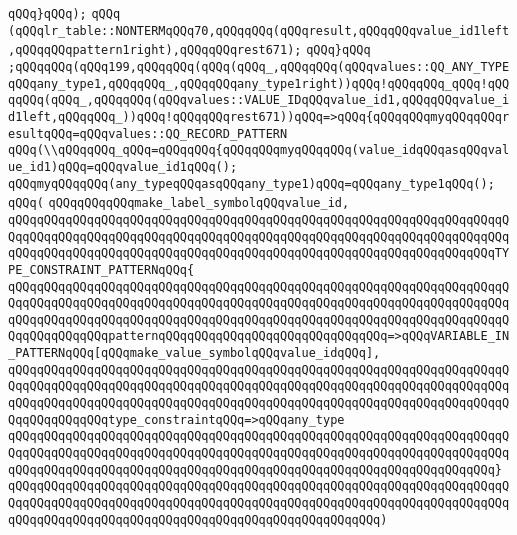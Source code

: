 \verb|qQQq}qQQq);|\newline
\verb|qQQq|\newline
\verb|(qQQqlr_table::NONTERMqQQq70,qQQqqQQq(qQQqresult,qQQqqQQqvalue_id1left,qQQqqQQqpattern1right),qQQqqQQqrest671);|\newline
\verb|qQQq}qQQq|\newline
\verb|;qQQqqQQq(qQQq199,qQQqqQQq(qQQq(qQQq_,qQQqqQQq(qQQqvalues::QQ_ANY_TYPEqQQqany_type1,qQQqqQQq_,qQQqqQQqany_type1right))qQQq!qQQqqQQq_qQQq!qQQqqQQq(qQQq_,qQQqqQQq(qQQqvalues::VALUE_IDqQQqvalue_id1,qQQqqQQqvalue_id1left,qQQqqQQq_))qQQq!qQQqqQQqrest671))qQQq=>qQQq{qQQqqQQqmyqQQqqQQqresultqQQq=qQQqvalues::QQ_RECORD_PATTERN|\newline
\verb|qQQq(\\qQQqqQQq_qQQq=qQQqqQQq{qQQqqQQqmyqQQqqQQq(value_idqQQqasqQQqvalue_id1)qQQq=qQQqvalue_id1qQQq();|\newline
\verb|qQQqmyqQQqqQQq(any_typeqQQqasqQQqany_type1)qQQq=qQQqany_type1qQQq();|\newline
\verb|qQQq(|\newline
\verb|qQQqqQQqqQQqmake_label_symbolqQQqvalue_id,|\newline
\verb|qQQqqQQqqQQqqQQqqQQqqQQqqQQqqQQqqQQqqQQqqQQqqQQqqQQqqQQqqQQqqQQqqQQqqQQqqQQqqQQqqQQqqQQqqQQqqQQqqQQqqQQqqQQqqQQqqQQqqQQqqQQqqQQqqQQqqQQqqQQqqQQqqQQqqQQqqQQqqQQqqQQqqQQqqQQqqQQqqQQqqQQqqQQqqQQqqQQqqQQqqQQqqQQqTYPE_CONSTRAINT_PATTERNqQQq{|\newline
\verb|qQQqqQQqqQQqqQQqqQQqqQQqqQQqqQQqqQQqqQQqqQQqqQQqqQQqqQQqqQQqqQQqqQQqqQQqqQQqqQQqqQQqqQQqqQQqqQQqqQQqqQQqqQQqqQQqqQQqqQQqqQQqqQQqqQQqqQQqqQQqqQQqqQQqqQQqqQQqqQQqqQQqqQQqqQQqqQQqqQQqqQQqqQQqqQQqqQQqqQQqqQQqqQQqqQQqqQQqqQQqqQQqpatternqQQqqQQqqQQqqQQqqQQqqQQqqQQqqQQq=>qQQqVARIABLE_IN_PATTERNqQQq[qQQqmake_value_symbolqQQqvalue_idqQQq],|\newline
\verb|qQQqqQQqqQQqqQQqqQQqqQQqqQQqqQQqqQQqqQQqqQQqqQQqqQQqqQQqqQQqqQQqqQQqqQQqqQQqqQQqqQQqqQQqqQQqqQQqqQQqqQQqqQQqqQQqqQQqqQQqqQQqqQQqqQQqqQQqqQQqqQQqqQQqqQQqqQQqqQQqqQQqqQQqqQQqqQQqqQQqqQQqqQQqqQQqqQQqqQQqqQQqqQQqqQQqqQQqqQQqqQQqtype_constraintqQQq=>qQQqany_type|\newline
\verb|qQQqqQQqqQQqqQQqqQQqqQQqqQQqqQQqqQQqqQQqqQQqqQQqqQQqqQQqqQQqqQQqqQQqqQQqqQQqqQQqqQQqqQQqqQQqqQQqqQQqqQQqqQQqqQQqqQQqqQQqqQQqqQQqqQQqqQQqqQQqqQQqqQQqqQQqqQQqqQQqqQQqqQQqqQQqqQQqqQQqqQQqqQQqqQQqqQQqqQQqqQQqqQQq}|\newline
\verb|qQQqqQQqqQQqqQQqqQQqqQQqqQQqqQQqqQQqqQQqqQQqqQQqqQQqqQQqqQQqqQQqqQQqqQQqqQQqqQQqqQQqqQQqqQQqqQQqqQQqqQQqqQQqqQQqqQQqqQQqqQQqqQQqqQQqqQQqqQQqqQQqqQQqqQQqqQQqqQQqqQQqqQQqqQQqqQQqqQQqqQQqqQQqqQQq)|\newline
